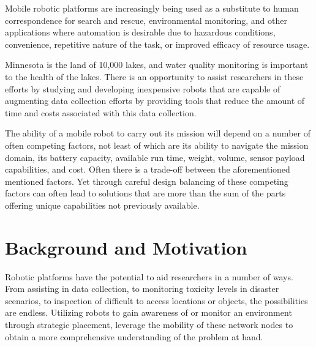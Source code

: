 
Mobile robotic platforms are increasingly being used as a substitute to human correspondence for search and rescue, environmental monitoring, and other applications where automation is desirable due to hazardous conditions, convenience, repetitive nature of the task, or improved efficacy of resource usage. 

Minnesota is the land of 10,000 lakes, and water quality monitoring is important to the health of the lakes. There is an opportunity to assist researchers in these efforts by studying and developing inexpensive robots that are capable of augmenting data collection efforts by providing tools that reduce the amount of time and costs associated with this data collection. 

The ability of a mobile robot to carry out its mission will depend on a number of often competing factors, not least of which are its ability to navigate the mission domain, its battery capacity, available run time, weight, volume, sensor payload capabilities, and cost. Often there is a trade-off between the aforementioned mentioned factors. Yet through careful design balancing of these competing factors can often lead to solutions that are more than the sum of the parts offering unique capabilities not previously available.

\section{Background and Motivation}
	\label{sec:background_and_motivation}


	Robotic platforms have the potential to aid researchers in a number of ways.  From assisting in data collection, to monitoring toxicity levels in disaster scenarios, to inspection of difficult to access locations or objects, the possibilities are endless. Utilizing robots to gain awareness of or monitor an environment through strategic placement, leverage the mobility of these network nodes to obtain a more comprehensive understanding of the problem at hand. 

